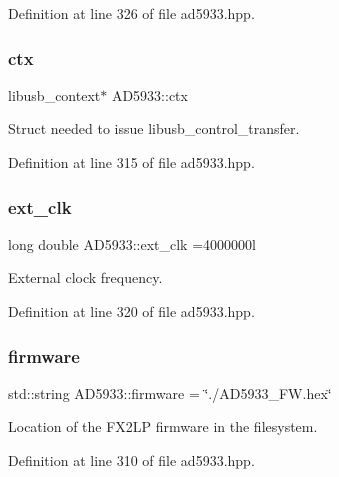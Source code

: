 Definition at line 326 of file ad5933.\+hpp.

\mbox{\label{struct_a_d5933_a4399d7961b63bcaccb5f15974d1aa551}} 
\subsubsection{\texorpdfstring{ctx}{ctx}}
{\footnotesize\ttfamily libusb\+\_\+context$\ast$ A\+D5933\+::ctx}



Struct needed to issue libusb\+\_\+control\+\_\+transfer. 



Definition at line 315 of file ad5933.\+hpp.

\mbox{\label{struct_a_d5933_a7b6a28a12eb6a913a04e895499c68176}} 
\subsubsection{\texorpdfstring{ext\+\_\+clk}{ext\_clk}}
{\footnotesize\ttfamily long double A\+D5933\+::ext\+\_\+clk =4000000l}



External clock frequency. 



Definition at line 320 of file ad5933.\+hpp.

\mbox{\label{struct_a_d5933_ac9313bfb503cad74b1b6d60d2c3a406d}} 
\subsubsection{\texorpdfstring{firmware}{firmware}}
{\footnotesize\ttfamily std\+::string A\+D5933\+::firmware = \char`\"{}./A\+D5933\+\_\+F\+W.\+hex\char`\"{}}



Location of the F\+X2\+LP firmware in the filesystem. 



Definition at line 310 of file ad5933.\+hpp.

\mbox{\label{struct_a_d5933_a9703faf65218591bf85b8338289e5162}} 

